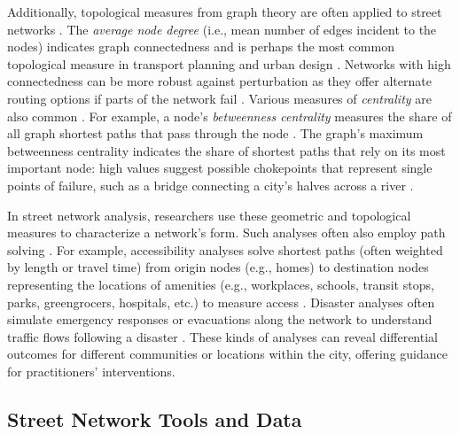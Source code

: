 \documentclass[12pt,letterpaper]{article} %
\begin{document}
Additionally, topological measures from graph theory are often applied to street networks \citep{barthelemy_spatial_2022}. The \textit{average node degree} (i.e., mean number of edges incident to the nodes) indicates graph connectedness and is perhaps the most common topological measure in transport planning and urban design \citep[e.g.,][]{barrington-leigh_century_2015,barrington-leigh_more_2017,barrington-leigh_global_2020}. Networks with high connectedness can be more robust against perturbation as they offer alternate routing options if parts of the network fail \citep{boeing_resilient_2024}. Various measures of \textit{centrality} are also common \citep{crucitti_centrality_2006}. For example, a node's \textit{betweenness centrality} measures the share of all graph shortest paths that pass through the node \citep{barthelemy_betweenness_2004,barthelemy_self-organization_2013}. The graph's maximum betweenness centrality indicates the share of shortest paths that rely on its most important node: high values suggest possible chokepoints that represent single points of failure, such as a bridge connecting a city's halves across a river \citep{boeing_resilient_2024}.

In street network analysis, researchers use these geometric and topological measures to characterize a network's form. Such analyses often also employ path solving \citep{miller_measuring_1999,wang_road_2020}. For example, accessibility analyses solve shortest paths (often weighted by length or travel time) from origin nodes (e.g., homes) to destination nodes representing the locations of amenities (e.g., workplaces, schools, transit stops, parks, greengrocers, hospitals, etc.) to measure access \citep{foti_behavioral_2014,liu_generalized_2022}. Disaster analyses often simulate emergency responses or evacuations along the network to understand traffic flows following a disaster \citep{sasabe_road_2020,tamakloe_finding_2021}. These kinds of analyses can reveal differential outcomes for different communities or locations within the city, offering guidance for practitioners' interventions.

\subsection{Street Network Tools and Data}
\end{document}
